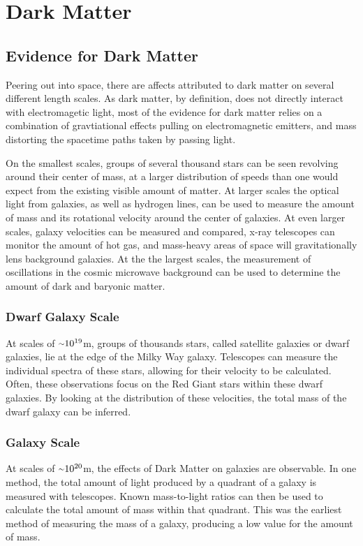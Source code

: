 \cleartooddpage[\thispagestyle{empty}]
\chapter{Dark Matter}

\section{Evidence for Dark Matter}

Peering out into space, there are affects attributed to dark matter on several different length scales.
As dark matter, by definition, does not directly interact with electromagetic light, most of the evidence for dark matter relies on a combination of gravtiational effects pulling on electromagnetic emitters, and mass distorting the spacetime paths taken by passing light.

On the smallest scales, groups of several thousand stars can be seen revolving around their center of mass, at a larger distribution of speeds than one would expect from the existing visible amount of matter.
At larger scales the optical light from galaxies, as well as hydrogen lines, can be used to measure the amount of mass and its rotational velocity around the center of galaxies.
At even larger scales, galaxy velocities can be measured and compared, x-ray telescopes can monitor the amount of hot gas, and mass-heavy areas of space will gravitationally lens background galaxies.
At the the largest scales, the measurement of oscillations in the cosmic microwave background can be used to determine the amount of dark and baryonic matter.


\subsection{Dwarf Galaxy Scale}
At scales of $\nicetilde 10^{19}$m, groups of thousands stars, called satellite galaxies or dwarf galaxies, lie at the edge of the Milky Way galaxy.
Telescopes can measure the individual spectra of these stars, allowing for their velocity to be calculated.
Often, these observations focus on the Red Giant stars within these dwarf galaxies\cite{dwarf_gal_red_giant}.
By looking at the distribution of these velocities, the total mass of the dwarf galaxy can be inferred.


\subsection{Galaxy Scale}
%
At scales of $\nicetilde 10^{20}$m, the effects of Dark Matter on galaxies are observable.
In one method, the total amount of light produced by a quadrant of a galaxy is measured with telescopes.
Known mass-to-light ratios can then be used to calculate the total amount of mass within that quadrant.
This was the earliest method of measuring the mass of a galaxy, producing a low value for the amount of mass.

